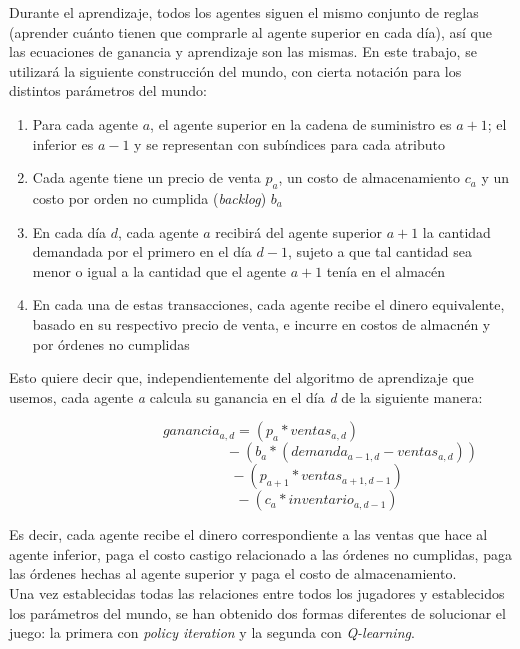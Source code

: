 Durante el aprendizaje, todos los agentes siguen el mismo conjunto de reglas (aprender cu\'anto tienen que comprarle al agente superior en cada d\'ia), as\'i que las ecuaciones de ganancia y aprendizaje son las mismas. En este trabajo, se utilizar\'a la siguiente construcci\'on del mundo, con cierta notaci\'on para los distintos par\'ametros del mundo:

\begin{enumerate}
    \item Para cada agente \textit{$a$}, el agente superior en la cadena de suministro es \textit{$a+1$}; el inferior es \textit{$a-1$} y se representan con sub\'indices para cada atributo
    \item Cada agente tiene un precio de venta \textit{$p_{a}$}, un costo de almacenamiento \textit{$c_{a}$} y un costo por orden no cumplida (\textit{backlog}) \textit{$b_{a}$}
    \item En cada d\'ia \textit{$d$}, cada agente \textit{$a$} recibir\'a del agente superior \textit{$a+1$} la cantidad demandada por el primero en el d\'ia \textit{$d-1$}, sujeto a que tal cantidad sea menor o igual a la cantidad que el agente \textit{$a+1$} ten\'ia en el almac\'en
    \item En cada una de estas transacciones, cada agente recibe el dinero equivalente, basado en su respectivo precio de venta, e incurre en costos de almacn\'en y por \'ordenes no cumplidas
\end{enumerate}


Esto quiere decir que, independientemente del algoritmo de aprendizaje que usemos, cada agente \textit{a} calcula su ganancia en el d\'ia \textit{d} de la siguiente manera:

$$
ganancia_{a,d} = (p_{a} * ventas_{a, d}) 
$$
$$
\quad  \quad  \quad  \quad  \quad  \quad  \quad  \quad  \quad \quad  \quad   \quad  \quad - (b_{a}* (demanda_{a-1,d} - ventas_{a,d})) 
$$
$$
\quad  \quad  \quad  \quad  \quad  \quad  \quad  \quad - (p_{a+1}*ventas_{a+1, d-1})
$$
$$
\quad  \quad  \quad  \quad  \quad  \quad  \quad  \quad - (c_{a}*inventario_{a,d-1})
$$

Es decir, cada agente recibe el dinero correspondiente a las ventas que hace al agente inferior, paga el costo castigo relacionado a las \'ordenes no cumplidas, paga las \'ordenes hechas al agente superior y paga el costo de almacenamiento.\\

Una vez establecidas todas las relaciones entre todos los jugadores y establecidos los par\'ametros del mundo, se han obtenido dos formas diferentes de solucionar el juego: la primera con \textit{policy iteration} y la segunda con \textit{Q-learning}.

